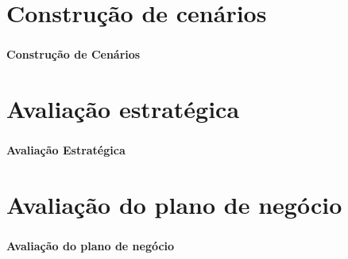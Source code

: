 \documentclass{beamer}
\begin{document}
\section{Construção de cenários}
\begin{frame}
  \frametitle{}
  \framesubtitle{}

  \begin{center}
    {\huge\textbf{Construção de Cenários}}
  \end{center}
\end{frame}

\section{Avaliação estratégica}
\begin{frame}
  \frametitle{}
  \framesubtitle{}

  \begin{center}
    {\huge\textbf{Avaliação Estratégica}}
  \end{center}
\end{frame}

\section{Avaliação do plano de negócio}
\begin{frame}
  \frametitle{}
  \framesubtitle{}

  \begin{center}
    {\huge\textbf{Avaliação do plano de negócio}}
  \end{center}
\end{frame}
\end{document}
